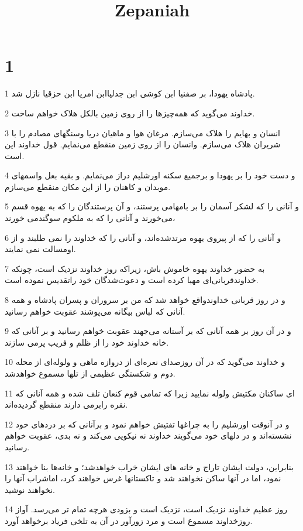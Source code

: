 

\title{Zepaniah}


\chapter{1}

\par 1 پادشاه یهودا، بر صفنیا ابن کوشی ابن جدلیاابن امریا ابن حزقیا نازل شد.
\par 2 خداوند می‌گوید که همه‌چیزها را از روی زمین بالکل هلاک خواهم ساخت.
\par 3 انسان و بهایم را هلاک می‌سازم. مرغان هوا و ماهیان دریا وسنگهای مصادم را با شریران هلاک می‌سازم. وانسان را از روی زمین منقطع می‌نمایم. قول خداوند این است.
\par 4 و دست خود را بر یهودا و برجمیع سکنه اورشلیم دراز می‌نمایم. و بقیه بعل واسمهای موبدان و کاهنان را از این مکان منقطع می‌سازم.
\par 5 و آنانی را که لشکر آسمان را بر بامهامی پرستند، و آن پرستندگان را که به یهوه قسم می‌خورند و آنانی را که به ملکوم سوگندمی خورند،
\par 6 و آنانی را که از پیروی یهوه مرتدشده‌اند، و آنانی را که خداوند را نمی طلبند و از اومسالت نمی نمایند.
\par 7 به حضور خداوند یهوه خاموش باش، زیراکه روز خداوند نزدیک است، چونکه خداوندقربانی‌ای مهیا کرده است و دعوت‌شدگان خود راتقدیس نموده است.
\par 8 و در روز قربانی خداوندواقع خواهد شد که من بر سروران و پسران پادشاه و همه آنانی که لباس بیگانه می‌پوشند عقوبت خواهم رسانید.
\par 9 و در آن روز بر همه آنانی که بر آستانه می‌جهند عقوبت خواهم رسانید و بر آنانی که خانه خداوند خود را از ظلم و فریب پرمی سازند.
\par 10 و خداوند می‌گوید که در آن روزصدای نعره‌ای از دروازه ماهی و ولوله‌ای از محله دوم و شکستگی عظیمی از تلها مسموع خواهدشد.
\par 11 ‌ای ساکنان مکتیش ولوله نمایید زیرا که تمامی قوم کنعان تلف شده و همه آنانی که نقره رابرمی دارند منقطع گردیده‌اند.
\par 12 و در آنوقت اورشلیم را به چراغها تفتیش خواهم نمود و برآنانی که بر دردهای خود نشسته‌اند و در دلهای خود می‌گویند خداوند نه نیکویی می‌کند و نه بدی، عقوبت خواهم رسانید.
\par 13 بنابراین، دولت ایشان تاراج و خانه های ایشان خراب خواهدشد؛ و خانه‌ها بنا خواهند نمود، اما در آنها ساکن نخواهند شد و تاکستانها غرس خواهند کرد، اماشراب آنها را نخواهند نوشید.
\par 14 روز عظیم خداوند نزدیک است، نزدیک است و بزودی هرچه تمام تر می‌رسد. آواز روزخداوند مسموع است و مرد زورآور در آن به تلخی فریاد برخواهد آورد.
